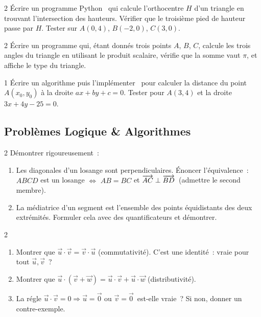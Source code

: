 \begin{bilan}
\begin{exo}{2}
\'Ecrire un programme Python \computer\ qui calcule l'orthocentre $H$ d'un triangle
en trouvant l'intersection des hauteurs.
V\'erifier que le troisi\`eme pied de hauteur passe par $H$.
Tester sur $A(0,4)$, $B(-2,0)$, $C(3,0)$.
\end{exo}

\begin{exo}{2}
\'Ecrire un programme qui, \'etant donn\'es trois points $A$, $B$, $C$,
calcule les trois angles du triangle en utilisant le produit scalaire,
v\'erifie que la somme vaut $\pi$, et affiche le type du triangle.
\end{exo}

\begin{exo}{1}
\'Ecrire un algorithme puis l'impl\'ementer \computer\ pour calculer
la distance du point $A(x_0,y_0)$ \`a la droite $ax+by+c=0$.
Tester pour $A(3,4)$ et la droite $3x+4y-25=0$.
\end{exo}

\subsection*{Probl\`emes Logique \& Algorithmes}

\begin{probleme}{2}
D\'emontrer rigoureusement~:
\begin{enumerate}
  \item Les diagonales d'un losange sont perpendiculaires.
        \'Enoncer l'\'equivalence~: \og $ABCD$ est un losange $\Leftrightarrow$
        $AB=BC$ et $\overrightarrow{AC}\perp\overrightarrow{BD}$\fg\ (admettre le second membre).
  \item La m\'ediatrice d'un segment est l'ensemble des points \'equidistants
        des deux extr\'emit\'es.
        Formuler cela avec des quantificateurs et d\'emontrer.
\end{enumerate}
\end{probleme}

\begin{probleme}{2}
\begin{enumerate}
  \item Montrer que $\vec{u}\cdot\vec{v}=\vec{v}\cdot\vec{u}$
        (commutativit\'e). C'est une identit\'e~: vraie pour tout $\vec{u},\vec{v}$~?
  \item Montrer que $\vec{u}\cdot(\vec{v}+\vec{w})=\vec{u}\cdot\vec{v}+\vec{u}\cdot\vec{w}$
        (distributivit\'e).
  \item La r\'egle \og $\vec{u}\cdot\vec{v}=0 \Rightarrow \vec{u}=\vec{0}$ ou $\vec{v}=\vec{0}$\fg\
        est-elle vraie~? Si non, donner un contre-exemple.
\end{enumerate}
\end{probleme}


\end{bilan}
